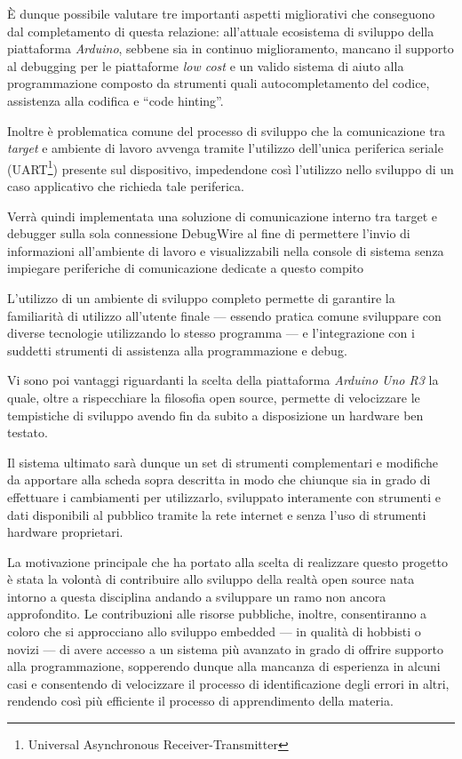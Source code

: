 È dunque possibile valutare tre importanti aspetti migliorativi che conseguono dal completamento di questa relazione: all'attuale ecosistema di sviluppo della piattaforma \textit{Arduino}, sebbene sia in continuo miglioramento, mancano il supporto al debugging per le piattaforme \textit{low cost} e un valido sistema di aiuto alla programmazione composto da strumenti quali autocompletamento del codice, assistenza alla codifica e ``code hinting''.

Inoltre è problematica comune del processo di sviluppo che la comunicazione tra \textit{target} e ambiente di lavoro avvenga tramite l'utilizzo dell'unica periferica seriale (UART\footnote{Universal Asynchronous Receiver-Transmitter}) presente sul dispositivo, impedendone così l'utilizzo nello sviluppo di un caso applicativo che richieda tale periferica.

Verrà quindi implementata una soluzione di comunicazione interno tra target e debugger sulla sola connessione DebugWire al fine di permettere l'invio di informazioni all'ambiente di lavoro e visualizzabili nella console di sistema senza impiegare periferiche di comunicazione dedicate a questo compito

L'utilizzo di un ambiente di sviluppo completo permette di garantire la familiarità di utilizzo all'utente finale --- essendo pratica comune sviluppare con diverse tecnologie utilizzando lo stesso programma --- e l'integrazione con i suddetti strumenti di assistenza alla programmazione e debug.

Vi sono poi vantaggi riguardanti la scelta della piattaforma \textit{Arduino Uno R3} la quale, oltre a rispecchiare la filosofia open source, permette di velocizzare le tempistiche di sviluppo avendo fin da subito a disposizione un hardware ben testato.\cite{site:arduino-mini-le}

Il sistema ultimato sarà dunque un set di strumenti complementari e modifiche da apportare alla scheda sopra descritta in modo che chiunque sia in grado di effettuare i cambiamenti per utilizzarlo, sviluppato interamente con strumenti e dati disponibili al pubblico tramite la rete internet e senza l'uso di strumenti hardware proprietari.

La motivazione principale che ha portato alla scelta di realizzare questo progetto è stata la volontà di contribuire allo sviluppo della realtà open source nata intorno a questa disciplina andando a sviluppare un ramo non ancora approfondito. 
Le contribuzioni alle risorse pubbliche, inoltre, consentiranno a coloro che si approcciano allo sviluppo embedded --- in qualità di hobbisti o novizi --- di avere accesso a un sistema più avanzato in grado di offrire supporto alla programmazione, sopperendo dunque alla mancanza di esperienza in alcuni casi e consentendo di velocizzare il processo di identificazione degli errori in altri, rendendo così più efficiente il processo di apprendimento della materia.